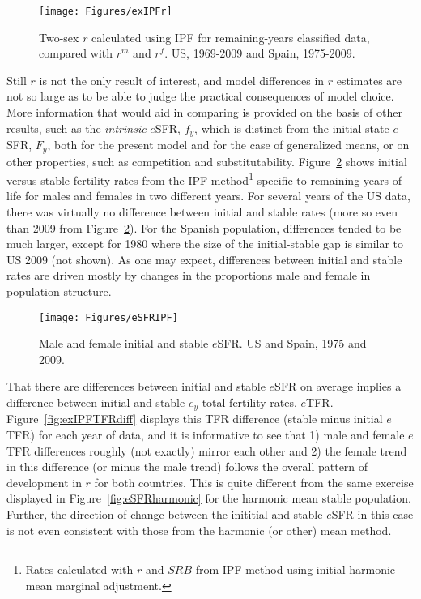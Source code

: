  \begin{figure}[ht!]
        \centering  
          \caption{Two-sex $r$ calculated using IPF for remaining-years
          classified data, compared with $r^m$ and $r^f$. US, 1969-2009 and
          Spain, 1975-2009.}
           \texttt{[image: Figures/exIPFr]}
          \label{fig:exIPFr}
\end{figure}

Still $r$ is not the only result of interest, and model differences in $r$
estimates are not so large as to be able to judge the practical consequences of
model choice. More information that would aid in comparing is provided on the
basis of other results, such as the \textit{intrinsic} $e$SFR, $f_y$, which is
distinct from the initial state $e$SFR, $F_y$, both for the present model and
for the case of generalized means, or on other properties, such as competition
and substitutability. Figure~\ref{fig:eSFRIPF} shows initial versus stable
fertility rates from the IPF method\footnote{Rates calculated with $r$
and $SRB$ from IPF method using initial harmonic mean marginal adjustment.}
specific to remaining years of life for males and females in two different years. 
For several years of the US data, there was virtually no difference between initial 
and stable rates (more so even than 2009 from Figure~\ref{fig:eSFRIPF}). For
the Spanish population, differences tended to be much larger, except for 1980
where the size of the initial-stable gap is similar to US 2009 (not shown). As
one may expect, differences between initial and stable rates are driven mostly 
by changes in the proportions male and female in population structure. 

\begin{figure}[ht!]
        \centering  
          \caption{Male and female initial and stable $e$SFR. US and
          Spain, 1975 and 2009.}
           \texttt{[image: Figures/eSFRIPF]}
          \label{fig:eSFRIPF}
\end{figure}

That there are differences between initial and stable $e$SFR on average implies
a difference between initial and stable $e_y$-total fertility rates, $e$TFR.
Figure~\ref{fig:exIPFTFRdiff} displays this TFR difference (stable minus
initial $e$TFR) for each year of data, and it is informative to see that 1)
male and female $e$TFR differences roughly (not exactly) mirror each other and
2) the female trend in this difference (or minus the male trend) follows the
overall pattern of development in $r$ for both countries. This is quite
different from the same exercise displayed in Figure~\ref{fig:eSFRharmonic} for
the harmonic mean stable population. Further, the direction of change between
the inititial and stable $e$SFR in this case is not even consistent with those
from the harmonic (or other) mean method.

